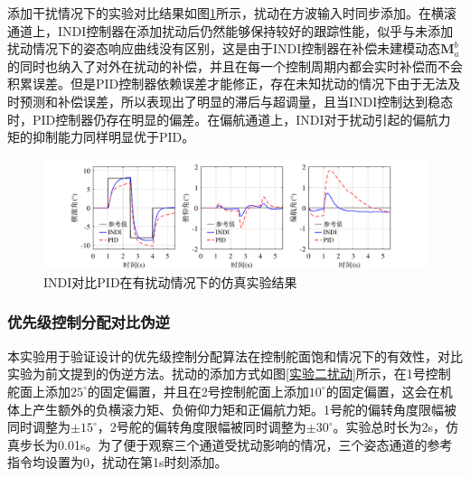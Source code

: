 添加干扰情况下的实验对比结果如图\ref{INDI对比PID仿真有扰动}所示，扰动在方波输入时同步添加。在横滚通道上，INDI控制器在添加扰动后仍然能够保持较好的跟踪性能，似乎与未添加扰动情况下的姿态响应曲线没有区别，这是由于INDI控制器在补偿未建模动态$\boldsymbol{M}_a^b$的同时也纳入了对外在扰动的补偿，并且在每一个控制周期内都会实时补偿而不会积累误差。但是PID控制器依赖误差才能修正，存在未知扰动的情况下由于无法及时预测和补偿误差，所以表现出了明显的滞后与超调量，且当INDI控制达到稳态时，PID控制器仍存在明显的偏差。在偏航通道上，INDI对于扰动引起的偏航力矩的抑制能力同样明显优于PID。
\begin{figure}[htbp]
	\centering
	\begin{minipage}[c]{1\textwidth}
        \centering
        \includegraphics[scale=1]{Fig/INDI对比PID有扰动仿真实验结果.pdf}
        \caption{\label{INDI对比PID仿真有扰动}INDI对比PID在有扰动情况下的仿真实验结果}
        \end{minipage}
\end{figure}

\subsubsection{优先级控制分配对比伪逆}

本实验用于验证设计的优先级控制分配算法在控制舵面饱和情况下的有效性，对比实验为前文提到的伪逆方法。扰动的添加方式如图\ref{实验二扰动}所示，在1号控制舵面上添加$25^{\circ}$的固定偏置，并且在2号控制舵面上添加$10^{\circ}$的固定偏置，这会在机体上产生额外的负横滚力矩、负俯仰力矩和正偏航力矩。1号舵的偏转角度限幅被同时调整为$\pm15^{\circ}$，2号舵的偏转角度限幅被同时调整为$\pm30^{\circ}$。实验总时长为2s，仿真步长为0.01s。为了便于观察三个通道受扰动影响的情况，三个姿态通道的参考指令均设置为0，扰动在第1s时刻添加。

